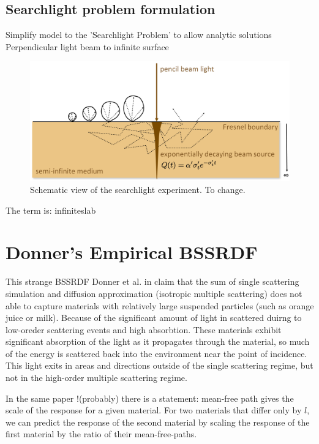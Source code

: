 \subsection{Searchlight problem formulation}
Simplify model to the 'Searchlight Problem' to allow analytic solutions
Perpendicular light beam to infinite surface \cite{Jacques1995}
\begin{figure}[h]
    \centering
    \includegraphics[width=\textwidth]{imgs/schemes/searchlight_disney}
    \caption{Schematic view of the searchlight experiment. To change.}
    \label{fig:searchlight_scheme}
\end{figure}

The term is: \gls{infiniteslab}

\section{Donner's Empirical BSSRDF}
This strange \gls{BSSRDF}
Donner et al. in \cite{Donner:2009:EBM} claim that the sum of single scattering
simulation and diffusion approximation (isotropic multiple scattering) does not
able to capture materials with relatively large suspended particles (such as
orange juice or milk). Because of the significant amount of light in scattered
duirng to low-oreder scattering events and high absorbtion.
These materials exhibit significant absorption of the light as it propagates
through the material, so much of the energy is scattered back into
the environment near the point of incidence. This light exits in areas and
directions outside of the single scattering regime, but not in the high-order
multiple scattering regime.

In the same paper !(probably) there is a statement:
mean-free path gives the scale of the response for a given material. For two
materials that differ only by $l$, we can predict the response of the second
material by scaling the response of the first material by the ratio of their
mean-free-paths.

